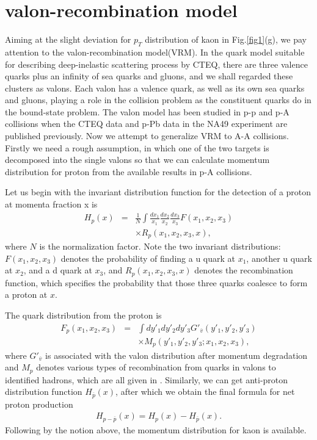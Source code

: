 \documentclass[twocolumn,aps,superscriptaddress,showpacs,nofootinbib,floatfix]{revtex4}
\begin{document}
\section{valon-recombination model}\label{VM6}
Aiming at the slight deviation for $p_T$ distribution of kaon in Fig.\ref{fig1}(g), we pay attention to the valon-recombination model(VRM)\cite{5i,Hwa:2002mv,Hwa:2001ih,Hwa:1980mv,Hwa:1980xv}. In the quark model suitable for describing deep-inelastic scattering process by CTEQ\cite{Hwa:2002mv}, there are three valence quarks plus an infinity of sea quarks and gluons\cite{Hwa:1980xv}, and we shall regarded these clusters as valons. Each valon has a valence quark, as well as its own sea quarks and gluons, playing a role in the collision problem as the constituent quarks do in the bound-state problem\cite{Hwa:2001ih}. The valon model has been studied in p-p and p-A collisions when the CTEQ data and p-Pb data in the NA49 experiment are published previously. Now we attempt to generalize VRM to A-A collisions. Firstly we need a rough assumption, in which one of the two targets is decomposed into the single valons so that we can calculate momentum distribution for proton from the available results\cite{Hwa:2001ih} in p-A collisions.

Let us begin with the invariant distribution function for the detection of a proton at momenta fraction x is 
\begin{eqnarray}
	H_p(x)&=&\frac{1}{N}\int \frac{dx_1}{x_1}\frac{dx_2}{x_2}\frac{dx_3}{x_3}F(x_1,x_2,x_3)\nonumber\\
	&&\times R_p(x_1,x_2,x_3,x),
	\label{6.1}
\end{eqnarray}
where $N$ is the normalization factor. Note the two invariant distributions: $F(x_1,x_2,x_3)$ denotes the probability of finding a u quark at $x_1$, another u quark at $x_2$, and a d quark at $x_3$, and $R_p(x_1,x_2,x_3,x)$ denotes the recombination function, which specifies the probability that those three quarks coalesce to form a proton at $x$.

The quark distribution from the proton is 
\begin{eqnarray}
	F_p(x_1,x_2,x_3)&=&\int dy'_1dy'_2dy'_3G'_{\overline v}(y'_1,y'_2,y'_3)\nonumber\\
	&&\times M_p(y'_1,y'_2,y'_3;x_1,x_2,x_3),
	\label{6.2}
\end{eqnarray}
where $G'_{\overline v}$ is associated with the valon distribution after momentum degradation and $M_p$ denotes various types of recombination from quarks in valons to identified hadrons, which are all given in \cite{Hwa:2001ih}. Similarly, we can get anti-proton distribution function $H_{\overline p}(x)$, after which we obtain the final formula for net proton production
\begin{eqnarray}
	H_{p-\overline p}(x)=H_p(x)-H_{\overline p}(x).\label{6.3}
\end{eqnarray}
Following by the notion above, the momentum distribution for kaon is available.
\end{document}
